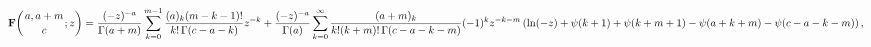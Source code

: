 \[\mathop{\mathbf{F}\/}\nolimits\!\left({a,a+m\atop c};z\right)=\frac{(-z)^{-a}}%
{\mathop{\Gamma\/}\nolimits\!\left(a+m\right)}\sum_{k=0}^{m-1}\frac{(a)_{k}(m-%
k-1)!}{k!\mathop{\Gamma\/}\nolimits\!\left(c-a-k\right)}z^{-k}+\frac{(-z)^{-a}%
}{\mathop{\Gamma\/}\nolimits\!\left(a\right)}\sum_{k=0}^{\infty}\frac{(a+m)_{k%
}}{k!(k+m)!\mathop{\Gamma\/}\nolimits\!\left(c-a-k-m\right)}(-1)^{k}z^{-k-m}\*%
\left(\mathop{\ln\/}\nolimits(-z)+\mathop{\psi\/}\nolimits\!\left(k+1\right)+%
\mathop{\psi\/}\nolimits\!\left(k+m+1\right)-\mathop{\psi\/}\nolimits\!\left(a%
+k+m\right)-\mathop{\psi\/}\nolimits\!\left(c-a-k-m\right)\right),\]